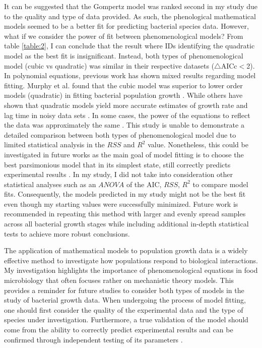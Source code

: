 \documentclass[11pt]{article}
\begin{document}
It can be suggested that the Gompertz model was ranked second in my study due to the quality and type of data provided. As such, the phenological
mathematical models seemed to be a better fit for predicting bacterial species data. However, what if we consider the power of fit between
phenomenological models? From table \ref{table:2}, I can conclude that the result where IDs identifying the quadratic model as the best fit is insignificant.
Instead, both types of phenomenological model (cubic vs quadratic) was similar in their respective datasets ($\triangle$AICc$<$2). In polynomial equations, previous work has shown mixed 
results regarding model fitting. Murphy et al. found that the cubic model was superior to lower order models (quadratic) in fitting bacterial population 
growth \cite{murphy_development_1996}. While others have shown that quadratic models yield more accurate estimates of growth rate and lag time in noisy data sets \cite{ng_mathematical_1997,gauch_prediction_1993,mcclure_predictive_1997}.
In some cases, the power of the equations to reflect the data was approximately the same \cite{gibson_predicting_1988}. This study is unable to demonstrate a 
detailed comparison between both types of phenomenological model due to limited statistical analysis in the $RSS$ and $R^{2}$ value. 
Nonetheless, this could be investigated in future works as the main goal of model fitting is to choose the best parsimonious model that in its 
simplest state, still correctly predicts experimental results \cite{gauch_prediction_1993,gibson_predicting_1988}. In my study, I did not take into consideration other statistical analyses
such as an $ANOVA$ of the AIC, $RSS$, $R^{2}$ to compare model fits. Consequently, the models predicted in my study might not be the best fit even 
though my starting values were successfully minimized. Future work is recommended in repeating this method with larger and evenly spread 
samples across all bacterial growth stages while including additional in-depth statistical tests to achieve more robust conclusions.

The application of mathematical models to population growth data is a widely effective method to investigate how populations respond to 
biological interactions. My investigation highlights the importance of phenomenological equations in food microbiology that often focuses rather
on mechanistic theory models. This provides a reminder for future studies to consider both types of models in the study of bacterial growth data.
When undergoing the process of model fitting, one should first consider the quality of the experimental data and the type of species under
investigation. Furthermore, a true validation of the model should come from the ability to correctly predict experimental results and can be 
confirmed through independent testing of its parameters \cite{peleg_microbial_2011}.
\end{document}
